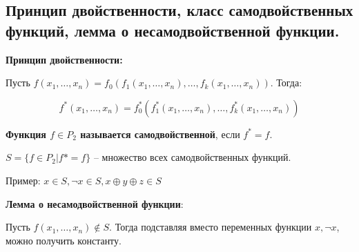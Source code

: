 \subsection{Принцип двойственности, класс самодвойственных функций, лемма о несамодвойственной функции.}

\textbf{Принцип двойственности:}  

   Пусть $f(x_1,\ldots,x_n) = f_0(f_1(x_1,\ldots,x_n),\ldots,f_k(x_1,\ldots,x_n))$. Тогда:

   $$f^*(x_1,\ldots,x_n) = f_0^*(f_1^*(x_1,\ldots,x_n),\ldots,f_k^*(x_1,\ldots,x_n))$$

 \textbf{Функция $f \in P_2$ называется самодвойственной}, если $f^* = f$.

  $S = \{f \in P_2 | f* = f\}$ -- множество всех самодвойственных функций.

  Пример: $x \in S, \neg x \in S, x \oplus y \oplus z \in S$

  \textbf{Лемма о несамодвойственной функции}:

   Пусть $f(x_1, \ldots, x_n) \notin S$. Тогда подставляя вместо переменных функции $x, \neg x$, можно получить константу.
